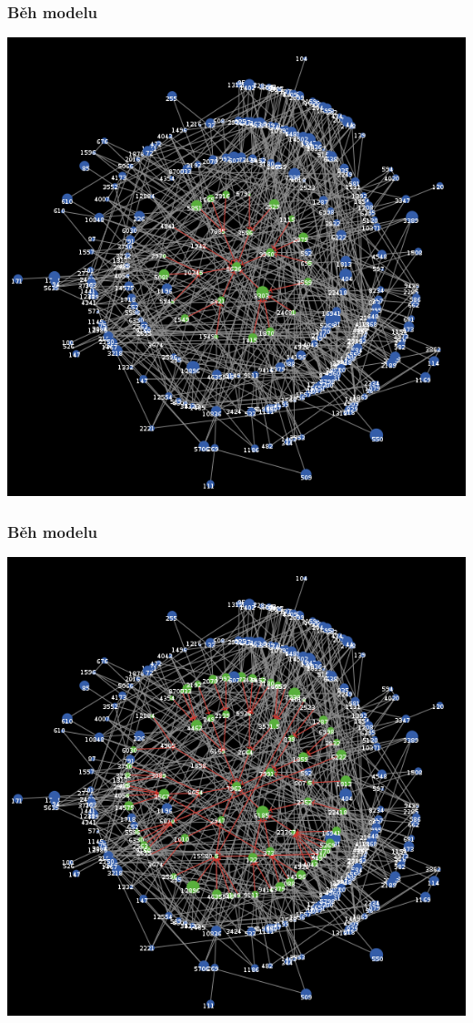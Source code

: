 \documentclass[xcolor=dvipsnames]{beamer}
\begin{document}
  \begin{frame}
    \frametitle{Běh modelu}
    \includegraphics[width=0.6\paperwidth]{2.png}
  \end{frame}
  \begin{frame}
    \frametitle{Běh modelu}
    \includegraphics[width=0.6\paperwidth]{3.png}
  \end{frame}
\end{document}
